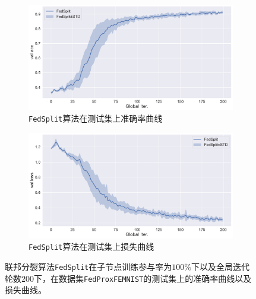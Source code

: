 \begin{figure}[ht]
\centering
\begin{subfigure}{.7\textwidth}
  \centering
  \includegraphics[width=.95\linewidth]{figures/fedsplit-200-val-acc.pdf}
  \caption{\texttt{FedSplit}算法在测试集上准确率曲线}
  \label{fig:fedsplit-200-val-acc}
\end{subfigure}
\begin{subfigure}{.7\textwidth}
  \centering
  \includegraphics[width=.95\linewidth]{figures/fedsplit-200-val-loss.pdf}
  \caption{\texttt{FedSplit}算法在测试集上损失曲线}
  \label{fig:fedsplit-200-val-loss}
\end{subfigure}
\caption{联邦分裂算法\texttt{FedSplit}在子节点训练参与率为$100\%$下以及全局迭代轮数$200$下，在数据集\texttt{FedProxFEMNIST}的测试集上的准确率曲线以及损失曲线。}
\label{fig:fedsplit-200}
\end{figure}
